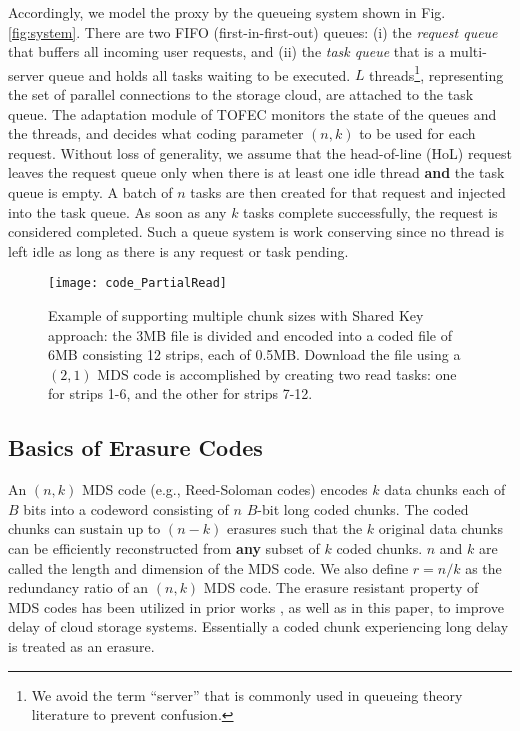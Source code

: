 \documentclass[journal]{IEEEtran}
\newcommand{\ourproposal}{TOFEC\xspace}
\begin{document}
Accordingly, we model the proxy by the queueing system shown in Fig.\ref{fig:system}. There are two FIFO (first-in-first-out) queues: (i) the {\em request queue} that buffers all incoming user requests, and (ii) the {\em task queue} that is a multi-server queue and holds all tasks waiting to be executed. $L$ threads\footnote{We avoid the term ``server'' that is commonly used in queueing theory literature to prevent confusion.}, representing the set of parallel connections to the storage cloud, are attached to the task queue. 
The adaptation module of \ourproposal monitors the state of the queues and the threads, and decides what coding parameter $(n,k)$ to be used for each request. 
Without loss of generality, we assume that the head-of-line (HoL) request leaves the request queue only when there is at least one idle thread {\bf and} the task queue is empty. A batch of $n$ tasks are then created for that request and injected into the task queue. As soon as any $k$ tasks complete successfully, the request is considered completed.  Such a queue system is work conserving since no thread is left idle as long as there is any request or task pending. 


\begin{figure}[t]
\centering
\texttt{[image: code\_PartialRead]}
\caption{Example of supporting multiple chunk sizes with Shared Key approach: the 3MB file is divided and encoded into a coded file of 6MB consisting 12 strips, each of 0.5MB. Download the file using a $(2,1)$ MDS code is accomplished by creating two read tasks: one for strips 1-6, and the other for strips 7-12.} 
\label{fig:partialRead}
\end{figure}

\subsection{Basics of Erasure Codes}
\label{ssec:model:code}
An $(n,k)$ MDS code (e.g., Reed-Soloman codes) encodes $k$ data chunks each of $B$ bits into a codeword consisting of $n$ $B$-bit long coded chunks. The coded chunks can sustain up to $(n-k)$ erasures such that the $k$ original data chunks can be efficiently reconstructed from {\bf any} subset of $k$ coded chunks.
$n$ and $k$ are called the length and dimension of the MDS code. We also define $r = n/k$ as the redundancy ratio of an $(n,k)$ MDS code. The erasure resistant property of MDS codes has been utilized in prior works \cite{fastcloud,Longbocodeingincloud, MDS-queue}, as well as in this paper, to improve delay of cloud storage systems. Essentially a coded chunk experiencing long delay is treated as an erasure. 
\end{document}
